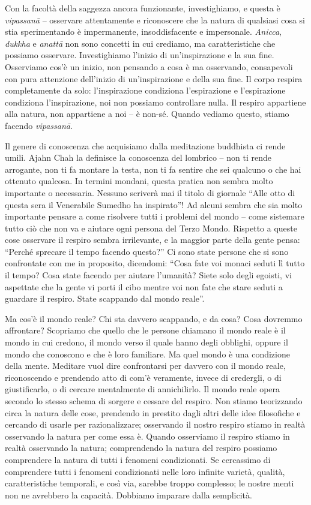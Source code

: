 Con la facoltà della saggezza ancora funzionante, investighiamo, e
questa è \emph{vipassanā} -- osservare attentamente e riconoscere che la
natura di qualsiasi cosa si stia sperimentando è impermanente,
insoddisfacente e impersonale. \emph{Anicca}, \emph{dukkha} e
\emph{anattā} non sono concetti in cui crediamo, ma caratteristiche che
possiamo osservare. Investighiamo l'inizio di un'inspirazione e la sua
fine. Osserviamo cos'è un inizio, non pensando a cosa è ma osservando,
consapevoli con pura attenzione dell'inizio di un'inspirazione e della
sua fine. Il corpo respira completamente da solo: l'inspirazione
condiziona l'espirazione e l'espirazione condiziona l'inspirazione, noi
non possiamo controllare nulla. Il respiro appartiene alla natura, non
appartiene a noi -- è non-sé. Quando vediamo questo, stiamo facendo
\emph{vipassanā}.

Il genere di conoscenza che acquisiamo dalla meditazione buddhista ci
rende umili. Ajahn Chah la definisce la conoscenza del lombrico -- non
ti rende arrogante, non ti fa montare la testa, non ti fa sentire che
sei qualcuno o che hai ottenuto qualcosa. In termini mondani, questa
pratica non sembra molto importante o necessaria. Nessuno scriverà mai
il titolo di giornale ``Alle otto di questa sera il Venerabile Sumedho
ha inspirato''! Ad alcuni sembra che sia molto importante pensare a come
risolvere tutti i problemi del mondo -- come sistemare tutto ciò che non
va e aiutare ogni persona del Terzo Mondo. Rispetto a queste cose
osservare il respiro sembra irrilevante, e la maggior parte della gente
pensa: ``Perché sprecare il tempo facendo questo?'' Ci sono state
persone che si sono confrontate con me in proposito, dicendomi: ``Cosa
fate voi monaci seduti lì tutto il tempo? Cosa state facendo per aiutare
l'umanità? Siete solo degli egoisti, vi aspettate che la gente vi porti
il cibo mentre voi non fate che stare seduti a guardare il respiro.
State scappando dal mondo reale''.

Ma cos'è il mondo reale? Chi sta davvero scappando, e da cosa? Cosa
dovremmo affrontare? Scopriamo che quello che le persone chiamano il
mondo reale è il mondo in cui credono, il mondo verso il quale hanno
degli obblighi, oppure il mondo che conoscono e che è loro familiare. Ma
quel mondo è una condizione della mente. Meditare vuol dire confrontarsi
per davvero con il mondo reale, riconoscendo e prendendo atto di com'è
veramente, invece di credergli, o di giustificarlo, o di cercare
mentalmente di annichilirlo. Il mondo reale opera secondo lo stesso
schema di sorgere e cessare del respiro. Non stiamo teorizzando circa la
natura delle cose, prendendo in prestito dagli altri delle idee
filosofiche e cercando di usarle per razionalizzare; osservando il
nostro respiro stiamo in realtà osservando la natura per come essa è.
Quando osserviamo il respiro stiamo in realtà osservando la natura;
comprendendo la natura del respiro possiamo comprendere la natura di
tutti i fenomeni condizionati. Se cercassimo di comprendere tutti i
fenomeni condizionati nelle loro infinite varietà, qualità,
caratteristiche temporali, e così via, sarebbe troppo complesso; le
nostre menti non ne avrebbero la capacità. Dobbiamo imparare dalla
semplicità.


